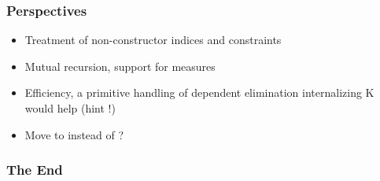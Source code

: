 \begin{frame}
  \frametitle{Perspectives}
  
  \begin{itemize}
  \item Treatment of non-constructor indices and constraints
  \item Mutual recursion, support for measures
  \item Efficiency, a primitive handling of dependent elimination
    internalizing K would help (hint !)

  \item Move to  instead of ?
  \end{itemize}
  
\end{frame}

\begin{frame}
  \frametitle{The End}

  \begin{center}
  \end{center}
\end{frame}


